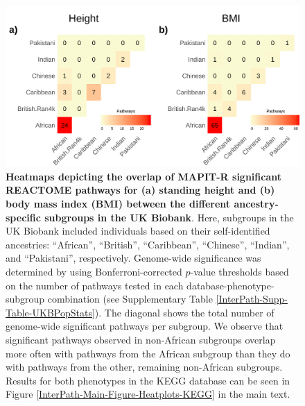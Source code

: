 \documentclass[10pt]{article}
\begin{document}
\setlength{\footskip}{1cm}
\begin{figure}[htbp]
\centering
\includegraphics[width = \textwidth]{Images/Supp/InterPath_Supp_Figure_Heatplots_REACTOME_vs4.png}
\caption{\textbf{Heatmaps depicting the overlap of MAPIT-R significant REACTOME pathways for (a) standing height and (b) body mass index (BMI) between the different ancestry-specific subgroups in the UK Biobank}. Here, subgroups in the UK Biobank included individuals based on their self-identified ancestries: ``African'', ``British'', ``Caribbean'', ``Chinese'', ``Indian'', and ``Pakistani'', respectively. Genome-wide significance was determined by using Bonferroni-corrected $p$-value thresholds based on the number of pathways tested in each database-phenotype-subgroup combination (see Supplementary Table \ref{InterPath-Supp-Table-UKBPopStats}). The diagonal shows the total number of genome-wide significant pathways per subgroup. We observe that significant pathways observed in non-African subgroups overlap more often with pathways from the African subgroup than they do with pathways from the other, remaining non-African subgroups. Results for both phenotypes in the KEGG database can be seen in Figure \ref{InterPath-Main-Figure-Heatplots-KEGG} in the main text.}
\label{InterPath-Supp-Figure-Heatplots-REACTOME}
\end{figure}
\clearpage
\setlength{\footskip}{1cm}

\end{document}

